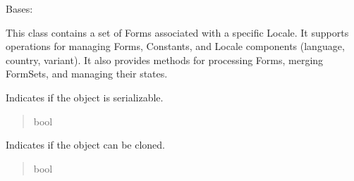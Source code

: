 \documentclass[letterpaper,10pt,english]{sphinxmanual}
\begin{document}
\begin{fulllineitems}
\label{\detokenize{apache_commons_validator_python:apache_commons_validator_python.form_set_new.FormSet}}
\pysigstartsignatures
{}
\pysigstopsignatures
\sphinxAtStartPar
Bases: 

\sphinxAtStartPar
This class contains a set of Forms associated with a specific Locale. It supports
operations for managing Forms, Constants, and Locale components (language, country,
variant). It also provides methods for processing Forms, merging FormSets, and
managing their states.

\begin{fulllineitems}
\label{\detokenize{apache_commons_validator_python:apache_commons_validator_python.form_set_new.FormSet.serializable}}
\pysigstartsignatures
{}
\pysigstopsignatures
\sphinxAtStartPar
Indicates if the object is serializable.
\begin{quote}\begin{description}
\sphinxAtStartPar
bool

\end{description}\end{quote}

\end{fulllineitems}


\begin{fulllineitems}
\label{\detokenize{apache_commons_validator_python:apache_commons_validator_python.form_set_new.FormSet.cloneable}}
\pysigstartsignatures
{}
\pysigstopsignatures
\sphinxAtStartPar
Indicates if the object can be cloned.
\begin{quote}\begin{description}
\sphinxAtStartPar
bool


\end{description}
\end{quote}
\end{fulllineitems}
\end{fulllineitems}
\end{document}
